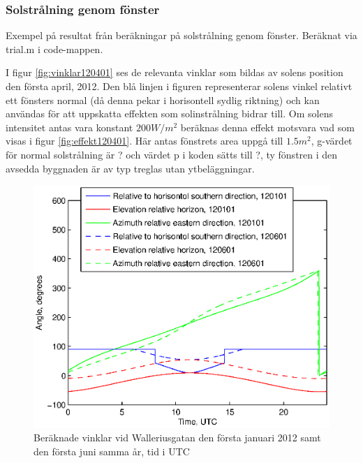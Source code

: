 \subsubsection{Solstrålning genom fönster}

Exempel på resultat från beräkningar på solstrålning genom fönster. Beräknat via trial.m i code-mappen.

I figur \ref{fig:vinklar120401} ses de relevanta vinklar som bildas av solens position den första april, 2012. Den blå linjen i figuren representerar solens vinkel relativt ett fönsters normal (då denna pekar i horisontell sydlig riktning) och kan användas för att uppskatta effekten som solinstrålning bidrar till. Om solens intensitet antas vara konstant $\unit{200}{W/m^2}$ beräknas denna effekt motsvara vad som visas i figur \ref{fig:effekt120401}. Här antas fönstrets area uppgå till $\unit{1.5}{m^2}$, g-värdet för normal solstrålning är ? och värdet p i koden sätts till ?, ty fönstren i den avsedda byggnaden är av typ treglas utan ytbeläggningar.

\begin{figure}[hpbt]
\centering
\includegraphics[scale=1]{images/sun0101and0601.eps}
\caption{\label{fig:sun0101and0601} Beräknade vinklar vid Walleriusgatan den första januari 2012 samt den första juni samma år, tid i UTC}
\end{figure}

